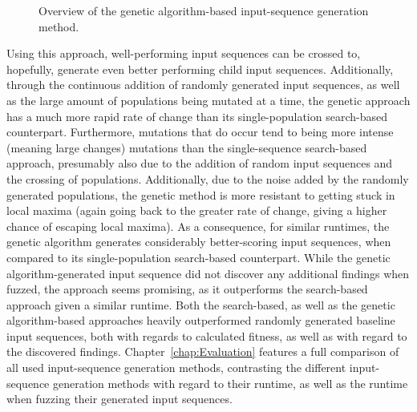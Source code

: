 \begin{figure}[H]
	\begin{centering}
\caption{Overview of the genetic algorithm-based input-sequence generation method.}
\label{fig:fuzz_genetic}
\end{centering}
\end{figure}

\vspace*{2mm}
Using this approach, well-performing input sequences can be crossed to, hopefully, generate even better performing child input sequences. Additionally, through the continuous addition of randomly generated input sequences, as well as the large amount of populations being mutated at a time, the genetic approach has a much more rapid rate of change than its single-population search-based counterpart. Furthermore, mutations that do occur tend to being more intense (meaning large changes) mutations than the single-sequence search-based approach, presumably also due to the addition of random input sequences and the crossing of populations. Additionally, due to the noise added by the randomly generated populations, the genetic method is more resistant to getting stuck in local maxima (again going back to the greater rate of change, giving a higher chance of escaping local maxima). As a consequence, for similar runtimes, the genetic algorithm generates considerably better-scoring input sequences, when compared to its single-population search-based counterpart. While the genetic algorithm-generated input sequence did not discover any additional findings when fuzzed, the approach seems promising, as it outperforms the search-based approach given a similar runtime. Both the search-based, as well as the genetic algorithm-based approaches heavily outperformed randomly generated baseline input sequences, both with regards to calculated fitness, as well as with regard to the discovered findings. Chapter~\ref{chap:Evaluation} features a full comparison of all used input-sequence generation methods, contrasting the different input-sequence generation methods with regard to their runtime, as well as the runtime when fuzzing their generated input sequences.
\cleardoublepage